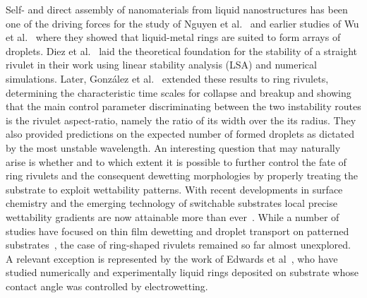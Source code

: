 \documentclass[twoside,twocolumn,9pt]{article}
\begin{document}
Self- and direct assembly of nanomaterials from liquid nanostructures has been one of the driving forces for the study of Nguyen et al.~\cite{nguyenCompetitionCollapseBreakup2012} and earlier studies of Wu et al.~\cite{wuBreakupPatternedNanoscale2010} where they showed that liquid-metal rings are suited to form arrays of droplets.
Diez et al.~\cite{diezBreakupFluidRivulets2009, diezStabilityFinitelengthRivulet2009} laid the theoretical foundation for the stability of a straight rivulet in their work using linear stability analysis (LSA) and numerical simulations. 
Later, Gonz{\'a}lez et al.~\cite{gonzalezStabilityLiquidRing2013} extended these results to ring rivulets, determining the characteristic time scales for collapse and breakup and showing that the main control parameter discriminating between the two instability routes is the rivulet aspect-ratio, namely the ratio of its width over the its radius.
They also provided predictions on the expected number of formed droplets as dictated by the most unstable wavelength.
An interesting question that may naturally arise is whether and to which extent it is possible to further control the fate of ring rivulets and the consequent dewetting morphologies by properly treating the substrate to exploit wettability patterns. 
With recent developments in surface chemistry and the emerging technology of switchable substrates local precise wettability gradients are now attainable more than ever~\cite{xinReversiblySwitchableWettability2010, stuartEmergingApplicationsStimuliresponsive2010,chenThermalresponsiveHydrogelSurface2010, ichimuraLightDrivenMotionLiquids2000, mugeleElectrowettingConvenientWay2005, edwardsControllingBreakupToroidal2021}.
While a number of studies have focused on thin film dewetting and droplet transport on patterned substrates~\cite{liuActuatingWaterDroplets2015,grawitterSteeringDropletsSubstrates2021, zitzControllingDewettingMorphologies2023}, the case of ring-shaped rivulets remained so far almost unexplored.
A relevant exception is represented by the work of Edwards et al~\cite{edwardsControllingBreakupToroidal2021}, who have studied numerically and experimentally liquid rings deposited on substrate whose contact angle was controlled by electrowetting. 
\end{document}
